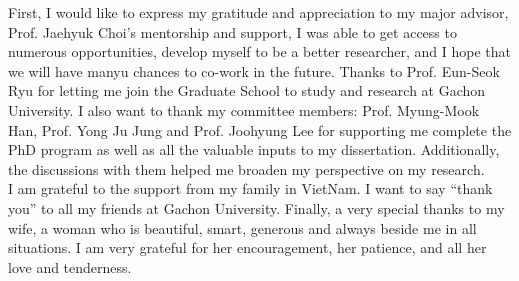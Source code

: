 
\begin{acknowledgements}       
First, I would like to express my gratitude and appreciation to my major advisor, Prof. Jaehyuk Choi’s mentorship and support, I was able to get access to numerous opportunities, develop myself to be a better researcher, and I hope that we will have manyu chances to co-work in the future. Thanks to Prof. Eun-Seok Ryu for letting me join the Graduate School to study and research at Gachon University. I also want to thank my committee members: Prof. Myung-Mook Han, Prof. Yong Ju Jung and Prof. Joohyung Lee for supporting me complete the PhD program as well as all the valuable inputs to my dissertation. Additionally, the discussions with them helped me broaden my perspective on my research.\\
I am grateful to the support from my family in VietNam. I want to say “thank you” to all my friends at Gachon University.
Finally, a very special thanks to my wife, a woman who is beautiful, smart, generous and always beside me in all situations. I am very grateful for her encouragement, her patience, and all her love and tenderness.
\end{acknowledgements}
